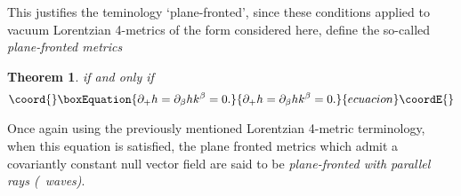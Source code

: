 \documentclass[12pt,a4paper]{article}
\newcounter{theorem}
\newtheorem{theorem}{Theorem}[section]   %
\newcounter{eg}
\def\p{\partial}
\begin{document}
This justifies the teminology `plane-fronted', since these conditions
applied to vacuum Lorentzian 4-metrics of the form considered here,
define the so-called {\em plane-fronted metrics}

\begin{theorem}

\coordHE{} if and only if
\begin{equation}\coord{}\boxEquation{
\p_+ h = \p_\beta h k^{\beta}=0.
}{
\p_+ h = \p_\beta h k^{\beta}=0.
}{ecuacion}\coordE{}\end{equation}

\end{theorem}

Once again using the previously mentioned Lorentzian 4-metric
terminology, when this equation is satisfied, the plane fronted
metrics which admit a covariantly constant null vector
field are said to be {\em plane-fronted with parallel rays
(\coordHE{}~waves)}.
\end{document}
